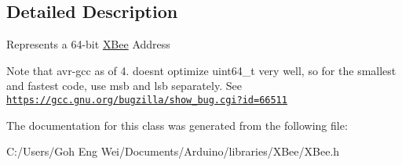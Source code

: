\subsection{Detailed Description}
Represents a 64-\/bit \hyperlink{class_x_bee}{X\+Bee} Address

Note that avr-\/gcc as of 4. doesn\textquotesingle{}t optimize uint64\+\_\+t very well, so for the smallest and fastest code, use msb and lsb separately. See \href{https://gcc.gnu.org/bugzilla/show_bug.cgi?id=66511}{\tt https\+://gcc.\+gnu.\+org/bugzilla/show\+\_\+bug.\+cgi?id=66511} 

The documentation for this class was generated from the following file\+:\begin{DoxyCompactItemize}
\item 
C\+:/\+Users/\+Goh Eng Wei/\+Documents/\+Arduino/libraries/\+X\+Bee/X\+Bee.\+h\end{DoxyCompactItemize}
